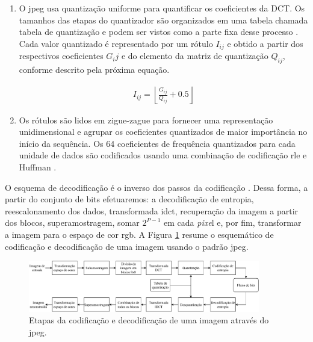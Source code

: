 \begin{enumerate}
	\item O \acrshort{jpeg} usa quantização uniforme para quantificar os coeficientes da DCT. Os tamanhos das etapas do quantizador são organizados em uma tabela chamada tabela de quantização e podem ser vistos como a parte fixa desse processo \cite{sayood2017introduction}. 
	Cada valor quantizado é representado por um rótulo $I_{ij}$ e obtido a partir dos respectivos coeficientes $G_ij$ e do elemento da matriz de quantização $Q_{ij}$, conforme descrito pela próxima equação. 
	
	\begin{equation}
	\begin{aligned}
	I_{ij} = \left \lfloor \frac{G_{ij}}{Q_{ij}} +0.5  \right \rfloor 
	\end{aligned}
	\end{equation}
	
	\item Os rótulos são lidos em zigue-zague para fornecer uma representação unidimensional e agrupar os coeficientes quantizados de maior importância no início da sequência. 
	Os 64 coeficientes de frequência quantizados para cada unidade de dados são codificados usando uma combinação de codificação \gls{rle} e Huffman \cite{salomon2007data}. 
	
\end{enumerate}  
O esquema de decodificação é o inverso dos passos da codificação \cite{sayood2017introduction}. Dessa forma, a partir do conjunto de bits efetuaremos: a decodificação de entropia, reescalonamento dos dados, transformada \acrshort{idct}, recuperação da imagem a partir dos blocos, superamostragem, somar $2^{P-1}$ em cada \textit{pixe}l e, por fim, transformar a imagem para o espaço de cor \acrshort{rgb}. A Figura \ref{fig:jpeg} resume o esquemático de codificação e decodificação de uma imagem usando o padrão \acrshort{jpeg}.


\begin{figure}[h]
	\centering
	\includegraphics[width=0.9\textwidth]{figuras/jpeg.pdf}
	\caption[Padrão \acrshort{jpeg}]{Etapas da codificação e decodificação de uma imagem através do \acrshort{jpeg}.}
	\label{fig:jpeg}
\end{figure}


